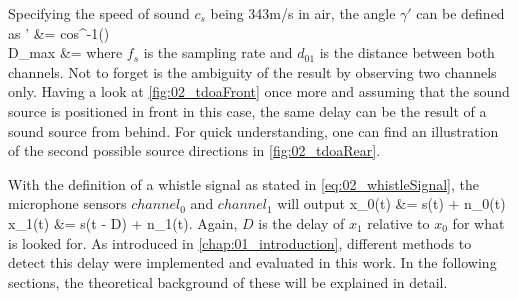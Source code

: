 Specifying the speed of sound $c_s$ being 343\si{m/s} in air, the angle
$\gamma'$ can be defined as
\bsub \bal
    \gamma' &= cos^{-1}\left(\right)
    \label{eq:02_tdoaAngle}\\
    D_{max} &= 
\eal \esub
where $f_s$ is the sampling rate and $d_{01}$ is the distance between both channels.
Not to forget is the ambiguity of the result by observing two channels only.
Having a look at \cref{fig:02_tdoaFront} once more and assuming that the sound source
is positioned in front in this case, the same delay can be the result of a
sound source from behind.
For quick understanding, one can find an illustration of the second possible
source directions in \cref{fig:02_tdoaRear}.


With the definition of a whistle signal as stated in \cref{eq:02_whistleSignal},
the microphone sensors $channel_0$ and $channel_1$ will output
\bsub
\label{eq:02_signalTimeDomain}
\bal
    x_0(t) &= s(t) + n_0(t)\\
    x_1(t) &= \alpha s(t - D) + n_1(t).
\eal \esub
Again, $D$ is the delay of $x_1$ relative to $x_0$ for what is looked for.
As introduced in \cref{chap:01_introduction}, different methods to detect this delay
were implemented and evaluated in this work.
In the following sections, the theoretical background of these will be
explained in detail.
